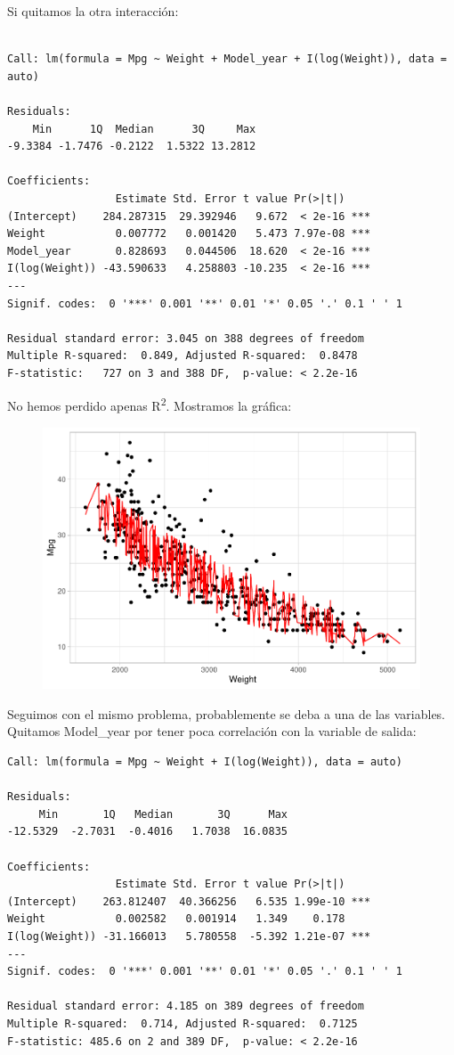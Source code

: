 Si quitamos la otra interacción:
\begin{verbatim}

Call: lm(formula = Mpg ~ Weight + Model_year + I(log(Weight)), data = auto)

Residuals:
    Min      1Q  Median      3Q     Max 
-9.3384 -1.7476 -0.2122  1.5322 13.2812 

Coefficients:
                 Estimate Std. Error t value Pr(>|t|)    
(Intercept)    284.287315  29.392946   9.672  < 2e-16 ***
Weight           0.007772   0.001420   5.473 7.97e-08 ***
Model_year       0.828693   0.044506  18.620  < 2e-16 ***
I(log(Weight)) -43.590633   4.258803 -10.235  < 2e-16 ***
---
Signif. codes:  0 '***' 0.001 '**' 0.01 '*' 0.05 '.' 0.1 ' ' 1

Residual standard error: 3.045 on 388 degrees of freedom
Multiple R-squared:  0.849, Adjusted R-squared:  0.8478 
F-statistic:   727 on 3 and 388 DF,  p-value: < 2.2e-16
\end{verbatim}

No hemos perdido apenas R\textsuperscript{2}. Mostramos la gráfica:

\begin{figure}[H]\includegraphics[width=.9\linewidth]{img/Regresion_files/figure-latex/unnamed-chunk-21-1} \caption{}\end{figure}

Seguimos con el mismo problema, probablemente se deba a una de las variables. Quitamos Model\_year por tener poca correlación con la variable de salida:

\begin{verbatim}
Call: lm(formula = Mpg ~ Weight + I(log(Weight)), data = auto)

Residuals:
     Min       1Q   Median       3Q      Max 
-12.5329  -2.7031  -0.4016   1.7038  16.0835 

Coefficients:
                 Estimate Std. Error t value Pr(>|t|)    
(Intercept)    263.812407  40.366256   6.535 1.99e-10 ***
Weight           0.002582   0.001914   1.349    0.178    
I(log(Weight)) -31.166013   5.780558  -5.392 1.21e-07 ***
---
Signif. codes:  0 '***' 0.001 '**' 0.01 '*' 0.05 '.' 0.1 ' ' 1

Residual standard error: 4.185 on 389 degrees of freedom
Multiple R-squared:  0.714, Adjusted R-squared:  0.7125 
F-statistic: 485.6 on 2 and 389 DF,  p-value: < 2.2e-16
\end{verbatim}

